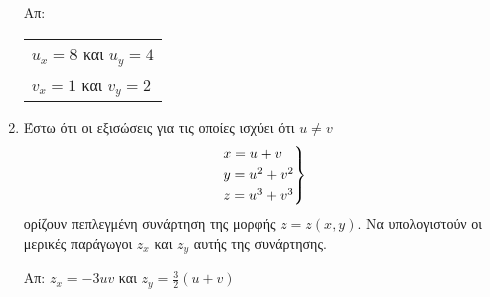 \begin{enumerate}
        \hfill Απ: \begin{tabular}{l}
            $ u_{x} = 8 $ και $ u_{y} = 4 $ \\
            $ v_{x} = 1 $ και $ v_{y} = 2 $
        \end{tabular} 

    \item Έστω ότι οι εξισώσεις για τις οποίες ισχύει ότι $ u \neq v $
        \[
            \begin{rcases}
             x=u+v \\
             y=u^{2}+v^{2} \\
             z=u^{3}+v^{3}
            \end{rcases}
        \] 
        ορίζουν πεπλεγμένη συνάρτηση της μορφής $ z = z(x,y) $. Να υπολογιστούν οι 
        μερικές παράγωγοι $ z_{x} $ και $ z_{y} $ αυτής της συνάρτησης.

        \hfill Απ: $ z_{x} = -3uv $ και $ z_{y} = \frac{3}{2} (u+v) $  

\end{enumerate}





